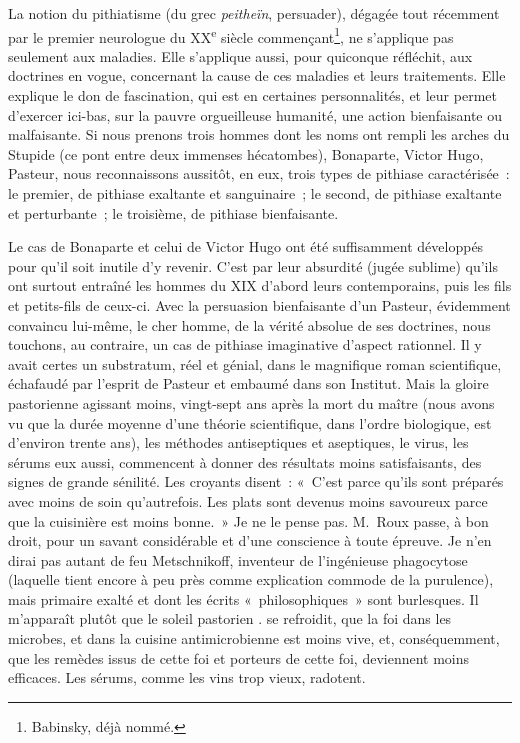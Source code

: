 \documentclass[french,twoside]{book} %
\begin{document}
La notion du pithiatisme (du grec {\itshape peitheïn}, persuader), dégagée tout récemment par le premier neurologue du XX\textsuperscript{e} siècle commençant\footnote{ Babinsky, déjà nommé.}, ne s’applique pas seulement aux maladies. Elle s’applique aussi, pour quiconque réfléchit, aux doctrines en vogue, concernant la cause de ces maladies et leurs traitements. Elle explique le don de fascination, qui est en certaines personnalités, et leur permet d’exercer ici-bas, sur la pauvre orgueilleuse humanité, une action bienfaisante ou malfaisante. Si nous prenons trois hommes dont les noms ont rempli les arches du Stupide (ce pont entre deux immenses hécatombes), Bonaparte, Victor Hugo, Pasteur, nous reconnaissons aussitôt, en eux, trois types de pithiase caractérisée : le premier, de pithiase exaltante et sanguinaire ; le second, de pithiase exaltante et perturbante ; le troisième, de pithiase bienfaisante.\par
Le cas de Bonaparte et celui de Victor Hugo ont été suffisamment développés pour qu’il soit inutile d’y revenir. C’est par leur absurdité (jugée sublime) qu’ils ont surtout entraîné les hommes du XIX d’abord leurs contemporains, puis les fils et petits-fils de ceux-ci. Avec la persuasion bienfaisante d’un Pasteur, évidemment convaincu lui-même, le cher homme, de la vérité absolue de ses doctrines, nous touchons, au contraire, un cas de pithiase imaginative d’aspect rationnel. Il y avait certes un substratum, réel et génial, dans le magnifique roman scientifique, échafaudé par l’esprit de Pasteur et embaumé dans son Institut. Mais la gloire pastorienne agissant moins, vingt-sept ans après la mort du maître (nous avons vu que la durée moyenne d’une théorie scientifique, dans l’ordre biologique, est d’environ trente ans), les méthodes antiseptiques et aseptiques, le virus, les sérums eux aussi, commencent à donner des résultats moins satisfaisants, des signes de grande sénilité. Les croyants disent : « C’est parce qu’ils sont préparés avec moins de soin qu’autrefois. Les plats sont devenus moins savoureux parce que la cuisinière est moins bonne. » Je ne le pense pas. M. Roux passe, à bon droit, pour un savant considérable et d’une conscience à toute épreuve. Je n’en dirai pas autant de feu Metschnikoff, inventeur de l’ingénieuse phagocytose (laquelle tient encore à peu près comme explication commode de la purulence), mais primaire exalté et dont les écrits « philosophiques » sont burlesques. Il m’apparaît plutôt que le soleil pastorien . se refroidit, que la foi dans les microbes, et dans la cuisine antimicrobienne est moins vive, et, conséquemment, que les remèdes issus de cette foi et porteurs de cette foi, deviennent moins efficaces. Les sérums, comme les vins trop vieux, radotent.\par
\end{document}
